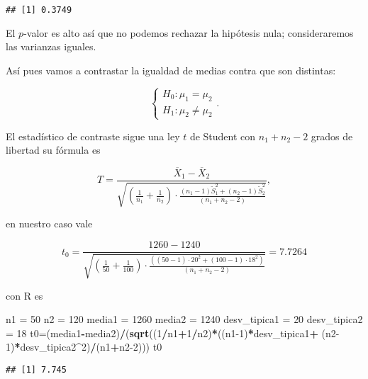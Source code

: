 \documentclass[
]{article}
\newenvironment{Shaded}{\begin{snugshade}}{\end{snugshade}}
\newcommand{\DecValTok}[1]{\textcolor[rgb]{0.00,0.00,0.81}{#1}}
\newcommand{\KeywordTok}[1]{\textcolor[rgb]{0.13,0.29,0.53}{\textbf{#1}}}
\newcommand{\NormalTok}[1]{#1}
\newcommand{\OperatorTok}[1]{\textcolor[rgb]{0.81,0.36,0.00}{\textbf{#1}}}
\newcommand{\StringTok}[1]{\textcolor[rgb]{0.31,0.60,0.02}{#1}}
\begin{document}
\begin{verbatim}
## [1] 0.3749
\end{verbatim}

El \(p\)-valor es alto así que no podemos rechazar la hipótesis nula;
consideraremos las varianzas iguales.

Así pues vamos a contrastar la igualdad de medias contra que son
distintas:

\[
\left\{
\begin{array}{ll}
H_{0}:\mu_1=\mu_2\\
H_{1}:\mu_2\not= \mu_2 
\end{array}
\right..
\]

El estadístico de contraste sigue una ley \(t\) de Student con
\(n_1+n_2-2\) grados de libertad su fórmula es

\[
T=\frac{\overline{X}_1-\overline{X}_2}
{\sqrt{(\frac1{n_1}+\frac1{n_2})\cdot 
\frac{(n_1-1)\widetilde{S}_1^2+(n_2-1)\widetilde{S}_2^2}
{(n_1+n_2-2)}}},
\]

en nuestro caso vale

\[
t_0=\frac{1260-1240}
{\sqrt{(\frac1{50}+\frac1{100})\cdot 
\frac{((50-1)\cdot 20^2+(100-1)\cdot  18^2)}
{(n_1+n_2-2)}}}=7.7264 
\]

con R es

\begin{Shaded}
\begin{Highlighting}[]
\NormalTok{n1 =}\StringTok{ }\DecValTok{50}
\NormalTok{n2 =}\StringTok{ }\DecValTok{120}
\NormalTok{media1 =}\StringTok{ }\DecValTok{1260}
\NormalTok{media2 =}\StringTok{ }\DecValTok{1240}
\NormalTok{desv\_tipica1 =}\StringTok{ }\DecValTok{20}
\NormalTok{desv\_tipica2 =}\StringTok{ }\DecValTok{18}
\NormalTok{t0=(media1}\OperatorTok{{-}}\NormalTok{media2)}\OperatorTok{/}\NormalTok{(}\KeywordTok{sqrt}\NormalTok{((}\DecValTok{1}\OperatorTok{/}\NormalTok{n1}\OperatorTok{+}\DecValTok{1}\OperatorTok{/}\NormalTok{n2)}\OperatorTok{*}\NormalTok{((n1}\DecValTok{{-}1}\NormalTok{)}\OperatorTok{*}\NormalTok{desv\_tipica1}\OperatorTok{+}
\StringTok{                        }\NormalTok{(n2}\DecValTok{{-}1}\NormalTok{)}\OperatorTok{*}\NormalTok{desv\_tipica2}\OperatorTok{\^{}}\DecValTok{2}\NormalTok{)}\OperatorTok{/}\NormalTok{(n1}\OperatorTok{+}\NormalTok{n2}\DecValTok{{-}2}\NormalTok{)))}
\NormalTok{t0}
\end{Highlighting}
\end{Shaded}

\begin{verbatim}
## [1] 7.745
\end{verbatim}
\end{document}
